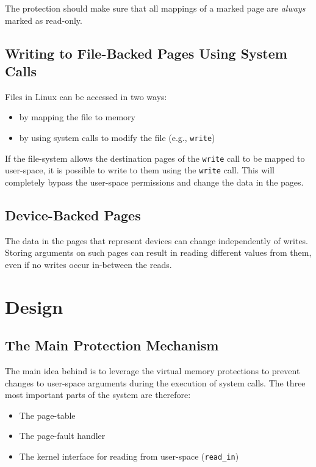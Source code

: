The protection should make sure that all mappings of a marked page are \emph{always}
marked as read-only.

\subsection{Writing to File-Backed Pages Using System Calls}

Files in Linux can be accessed in two ways:
\begin{itemize}
    \item by mapping the file to memory
    \item by using system calls to modify the file (e.g., \texttt{write})
\end{itemize}

If the file-system allows the destination pages of the \texttt{write} call to be
mapped to user-space, it is possible to write to them using the \texttt{write}
call. This will completely bypass the user-space permissions and change the data
in the pages.

\subsection{Device-Backed Pages}

The data in the pages that represent devices can change independently of writes.
Storing arguments on such pages can result in reading different values from them,
even if no writes occur in-between the reads.

\section{Design}
\label{sec:design}

\subsection{The Main Protection Mechanism}
\label{subsec:mainmechanism}

The main idea behind \sysname is to leverage the virtual memory protections to
prevent changes to user-space arguments during the execution of system calls.
The three most important parts of the system are therefore:

\begin{itemize}
\item The page-table
\item The page-fault handler
\item The kernel interface for reading from user-space (\texttt{read\_in})
\end{itemize}

